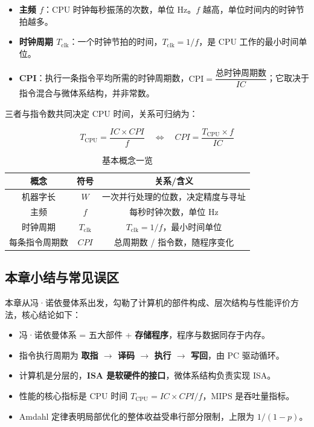 \begin{itemize}
    \item \textbf{主频 $f$}：CPU 时钟每秒振荡的次数，单位 Hz。$f$ 越高，单位时间内的时钟节拍越多。
    \item \textbf{时钟周期 $T_{\text{clk}}$}：一个时钟节拍的时间，$T_{\text{clk}} = 1/f$，是 CPU 工作的最小时间单位。
    \item \textbf{CPI}：执行一条指令平均所需的时钟周期数，$\text{CPI} = \dfrac{\text{总时钟周期数}}{IC}$；它取决于指令混合与微体系结构，并非常数。
\end{itemize}

三者与指令数共同决定 CPU 时间，关系可归纳为：

\begin{equation}
T_{\text{CPU}} = \frac{IC \times CPI}{f}
\quad\Longleftrightarrow\quad
CPI = \frac{T_{\text{CPU}} \times f}{IC}
\end{equation}

\begin{table}[H]
\centering
\caption{基本概念一览}
\label{tab:concepts}
\begin{tabulary}{\textwidth}{CCC}
\toprule
\textbf{概念} & \textbf{符号} & \textbf{关系/含义} \\
\midrule
机器字长 & $W$ & 一次并行处理的位数，决定精度与寻址 \\
主频 & $f$ & 每秒时钟次数，单位 Hz \\
时钟周期 & $T_{\text{clk}}$ & $T_{\text{clk}} = 1/f$，最小时间单位 \\
每条指令周期数 & $CPI$ & 总周期数 / 指令数，随程序变化 \\
\bottomrule
\end{tabulary}
\end{table}

\subsection{本章小结与常见误区}

本章从冯·诺依曼体系出发，勾勒了计算机的部件构成、层次结构与性能评价方法，核心结论如下：

\begin{itemize}
    \item 冯·诺依曼体系 = 五大部件 + \textbf{存储程序}，程序与数据同存于内存。
    \item 指令执行周期为 \textbf{取指 $\to$ 译码 $\to$ 执行 $\to$ 写回}，由 PC 驱动循环。
    \item 计算机是分层的，\textbf{ISA 是软硬件的接口}，微体系结构负责实现 ISA。
    \item 性能的核心指标是 CPU 时间 $T_{\text{CPU}} = IC \times CPI / f$，MIPS 是吞吐量指标。
    \item Amdahl 定律表明局部优化的整体收益受串行部分限制，上限为 $1/(1-p)$。
\end{itemize}

